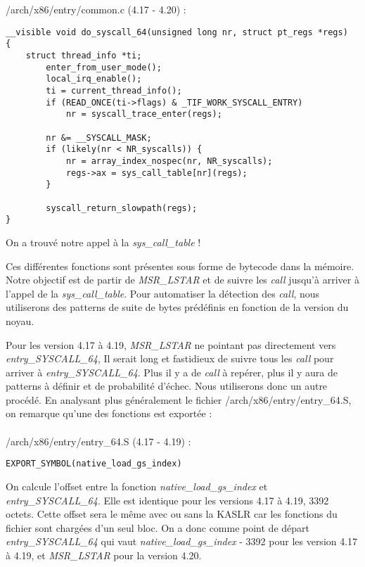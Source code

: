 \documentclass[journal, a4paper]{IEEEtran}
\begin{document}
\\
\\
/arch/x86/entry/common.c (4.17 - 4.20) :
\begin{lstlisting}[style=CStyle]
__visible void do_syscall_64(unsigned long nr, struct pt_regs *regs)
{
	struct thread_info *ti;
		enter_from_user_mode();
		local_irq_enable();
		ti = current_thread_info();
		if (READ_ONCE(ti->flags) & _TIF_WORK_SYSCALL_ENTRY)
			nr = syscall_trace_enter(regs);

		nr &= __SYSCALL_MASK;
		if (likely(nr < NR_syscalls)) {
			nr = array_index_nospec(nr, NR_syscalls);
			regs->ax = sys_call_table[nr](regs);
		}

		syscall_return_slowpath(regs);
}
\end{lstlisting}
On a trouvé notre appel à la \textit{sys\_call\_table} !

Ces différentes fonctions sont présentes sous forme de bytecode dans la mémoire. Notre objectif est de partir de \textit{MSR\_LSTAR} et de suivre les \textit{call} jusqu'à arriver à l'appel de la \textit{sys\_call\_table}. Pour automatiser la détection des \textit{call}, nous utiliserons des patterns de suite de bytes prédéfinis en fonction de la version du noyau.

Pour les version 4.17 à 4.19, \textit{MSR\_LSTAR} ne pointant pas directement vers \textit{entry\_SYSCALL\_64}, Il serait long et fastidieux de suivre tous les \textit{call} pour arriver à \textit{entry\_SYSCALL\_64}. Plus il y a de \textit{call} à repérer, plus il y aura de patterns à définir et de probabilité d'échec. Nous utiliserons donc un autre procédé. En analysant plus généralement le fichier /arch/x86/entry/entry\_64.S, on remarque qu'une des fonctions est exportée :
\\
\\
/arch/x86/entry/entry\_64.S (4.17 - 4.19) :
\begin{lstlisting}[style=CStyle]
EXPORT_SYMBOL(native_load_gs_index)
\end{lstlisting}
On calcule l'offset entre la fonction \textit{native\_load\_gs\_index} et \textit{entry\_SYSCALL\_64}. Elle est identique pour les versions 4.17 à 4.19, 3392 octets. Cette offset sera le même avec ou sans la KASLR car les fonctions du fichier sont chargées d'un seul bloc. On a donc comme point de départ \textit{entry\_SYSCALL\_64} qui vaut \textit{native\_load\_gs\_index} - 3392 pour les version 4.17 à 4.19, et \textit{MSR\_LSTAR} pour la version 4.20.
\end{document}
